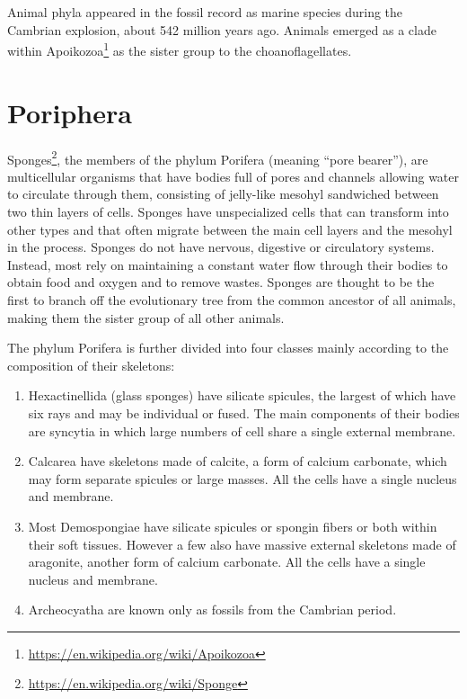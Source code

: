 \documentclass[]{book}
\providecommand{\tightlist}{%
  \setlength{\itemsep}{0pt}\setlength{\parskip}{0pt}}
\let\rmarkdownfootnote\footnote%
\def\footnote{\protect\rmarkdownfootnote}
\renewcommand{\href}[2]{#2\footnote{\url{#1}}}
\begin{document}
Animal phyla appeared in the fossil record as marine species during the Cambrian explosion, about 542 million years ago. Animals emerged as a clade within \href{https://en.wikipedia.org/wiki/Apoikozoa}{Apoikozoa} as the sister group to the choanoflagellates.

\hypertarget{poriphera}{%
\section{Poriphera}\label{poriphera}}

\href{https://en.wikipedia.org/wiki/Sponge}{Sponges}, the members of the phylum Porifera (meaning ``pore bearer''), are multicellular organisms that have bodies full of pores and channels allowing water to circulate through them, consisting of jelly-like mesohyl sandwiched between two thin layers of cells. Sponges have unspecialized cells that can transform into other types and that often migrate between the main cell layers and the mesohyl in the process. Sponges do not have nervous, digestive or circulatory systems. Instead, most rely on maintaining a constant water flow through their bodies to obtain food and oxygen and to remove wastes. Sponges are thought to be the first to branch off the evolutionary tree from the common ancestor of all animals, making them the sister group of all other animals.

The phylum Porifera is further divided into four classes mainly according to the composition of their skeletons:

\begin{enumerate}
\def\labelenumi{\arabic{enumi}.}
\tightlist
\item
  Hexactinellida (glass sponges) have silicate spicules, the largest of which have six rays and may be individual or fused. The main components of their bodies are syncytia in which large numbers of cell share a single external membrane.
\item
  Calcarea have skeletons made of calcite, a form of calcium carbonate, which may form separate spicules or large masses. All the cells have a single nucleus and membrane.
\item
  Most Demospongiae have silicate spicules or spongin fibers or both within their soft tissues. However a few also have massive external skeletons made of aragonite, another form of calcium carbonate. All the cells have a single nucleus and membrane.
\item
  Archeocyatha are known only as fossils from the Cambrian period.
\end{enumerate}
\end{document}
